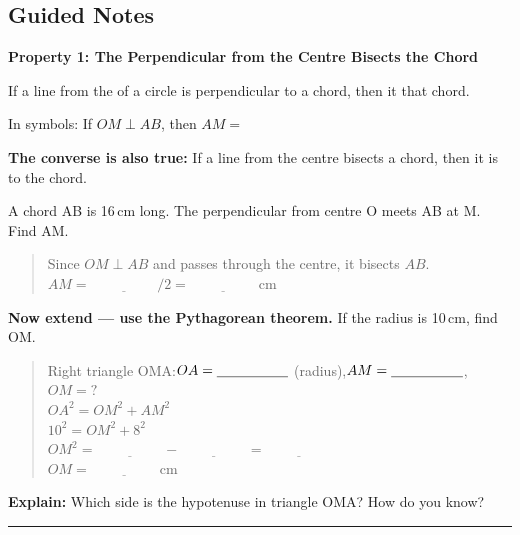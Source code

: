 \documentclass[11pt, a4paper]{article}
\newcommand{\blank}[1]{\underline{\hspace{#1}}}
\newcommand{\answerline}{\par\vspace{0.45cm}\noindent\rule{\linewidth}{0.4pt}\par\vspace{0.1cm}}
\begin{document}
\subsection{Guided Notes}

\textbf{Property 1: The Perpendicular from the Centre Bisects the Chord}

If a line from the \blank{3cm} of a circle is perpendicular to a chord, then it \blank{4.5cm} that chord.

\begin{center}
\end{center}

In symbols: If $OM \perp AB$, then $AM =$ \blank{2cm}

\textbf{The converse is also true:} If a line from the centre bisects a chord, then it is \blank{3.5cm} to the chord.

\begin{tcolorbox}[worked, title=Worked Example 1]
A chord AB is 16\,cm long. The perpendicular from centre O meets AB at M. Find AM.
\begin{quote}
Since $OM \perp AB$ and passes through the centre, it bisects $AB$.\\
$AM = \blank{2cm}/2 = \blank{2cm}$\,cm
\end{quote}
\textbf{Now extend --- use the Pythagorean theorem.} If the radius is 10\,cm, find OM.
\begin{quote}
Right triangle OMA:\quad $OA = \blank{1.8cm}$ (radius),\quad $AM = \blank{1.8cm}$,\quad $OM = ?$\\[5pt]
$OA^2 = OM^2 + AM^2$\\[3pt]
$10^2 = OM^2 + 8^2$\\[3pt]
$OM^2 = \blank{2cm} - \blank{2cm} = \blank{2cm}$\\[3pt]
$OM = \blank{2cm}$\,cm
\end{quote}
\textbf{Explain:} Which side is the hypotenuse in triangle OMA? How do you know?
\answerline
\end{tcolorbox}
\end{document}
